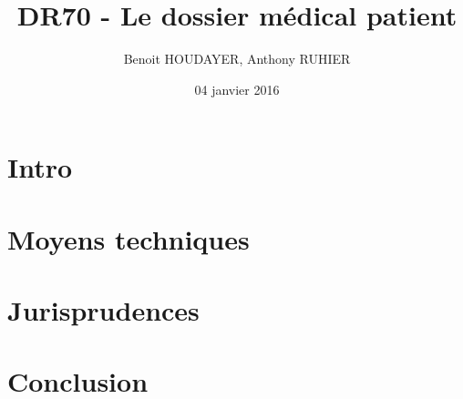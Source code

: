 \documentclass{article}
\title{\textbf{DR70 - Le dossier médical patient}}
\author{Benoit HOUDAYER, Anthony RUHIER}
\date{04 janvier 2016}
\begin{document}
    \maketitle
    \tableofcontents

    \vspace{1em}

    \section{Intro}
    \section{Moyens techniques}


    \section{Jurisprudences}


    \section{Conclusion}

\end{document}
